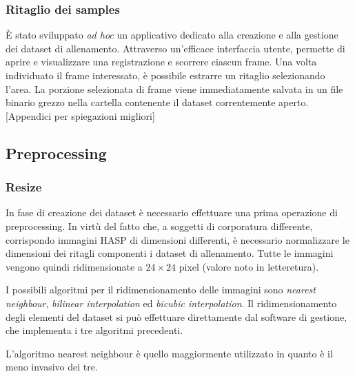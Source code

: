            \subsubsection{Ritaglio dei samples}
                È stato sviluppato \emph{ad hoc} un applicativo dedicato alla creazione e alla gestione dei dataset di allenamento.
                Attraverso un'efficace interfaccia utente, permette di aprire e visualizzare una registrazione e scorrere ciascun frame. Una volta individuato il frame interessato, è possibile estrarre un ritaglio selezionando l'area. La porzione selezionata di frame viene immediatamente salvata in un file binario grezzo nella cartella contenente il dataset correntemente aperto.
                [Appendici per spiegazioni migliori]

        \subsection{Preprocessing}
        \label{sub:preprocessing}
            \subsubsection{Resize}
                In fase di creazione dei dataset è necessario effettuare una prima operazione di preprocessing.
                In virtù del fatto che, a soggetti di corporatura differente, corrispondo immagini HASP di dimensioni differenti, è necessario normalizzare le dimensioni dei ritagli componenti i dataset di allenamento.
                Tutte le immagini vengono quindi ridimensionate a $24 \times 24$ pixel (valore noto in letteretura).

                I possibili algoritmi per il ridimensionamento delle immagini sono \emph{nearest neighbour}, \emph{bilinear interpolation} ed \emph{bicubic interpolation}.
                Il ridimensionamento degli elementi del dataset si può effettuare direttamente dal software di gestione, che implementa i tre algoritmi precedenti.

                L'algoritmo nearest neighbour è quello maggiormente utilizzato in quanto è il meno invasivo dei tre.

